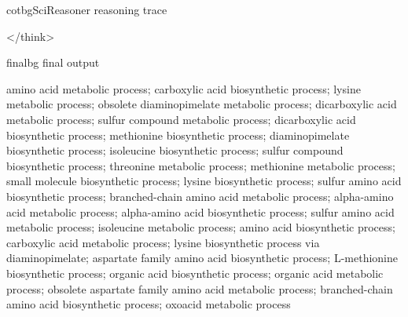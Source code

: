 \begin{appendices}
\begin{fullcotsection}{cotbg}{SciReasoner reasoning trace}
\begin{cotverbatim}
</think>

\end{cotverbatim}

\end{fullcotsection}

\par\medskip

 
\begin{fullcotsection}{finalbg}{\projName{} final output}

\begin{cotverbatim}

amino acid metabolic process; carboxylic acid biosynthetic process; lysine metabolic process; obsolete diaminopimelate metabolic process; dicarboxylic acid metabolic process; sulfur compound metabolic process; dicarboxylic acid biosynthetic process; methionine biosynthetic process; diaminopimelate biosynthetic process; isoleucine biosynthetic process; sulfur compound biosynthetic process; threonine metabolic process; methionine metabolic process; small molecule biosynthetic process; lysine biosynthetic process; sulfur amino acid biosynthetic process; branched-chain amino acid metabolic process; alpha-amino acid metabolic process; alpha-amino acid biosynthetic process; sulfur amino acid metabolic process; isoleucine metabolic process; amino acid biosynthetic process; carboxylic acid metabolic process; lysine biosynthetic process via diaminopimelate; aspartate family amino acid biosynthetic process; L-methionine biosynthetic process; organic acid biosynthetic process; organic acid metabolic process; obsolete aspartate family amino acid metabolic process; branched-chain amino acid biosynthetic process; oxoacid metabolic process

\end{cotverbatim}

\end{fullcotsection}

 

 

 

 

 

 

 

 

 

 

 

 

 

 

 


\end{appendices}
